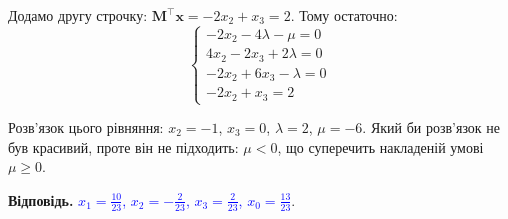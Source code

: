 \documentclass{test_template}
\begin{document}
Додамо другу строчку: $\mathbf{M}^{\top}\mathbf{x} = -2x_2 + x_3 = 2$. Тому остаточно:
\begin{equation*}
    \begin{cases}
        -2x_2 - 4\lambda - \mu = 0 \\
        4x_2 - 2x_3 + 2\lambda = 0 \\
        -2x_2 + 6x_3 - \lambda = 0 \\
        -2x_2 + x_3 = 2
    \end{cases}
\end{equation*}

Розв'язок цього рівняння: $x_2=-1$, $x_3=0$, $\lambda=2$, $\mu=-6$. Який би 
розв'язок не був красивий, проте він не підходить: $\mu<0$, що суперечить 
накладеній умові $\mu \geq 0$. 

\textbf{Відповідь.} \textcolor{blue}{$x_1 = \frac{10}{23}$, $x_2 = -\frac{2}{23}$, $x_3 = \frac{2}{23}$,
$x_0 = \frac{13}{23}$}.
\end{document}
